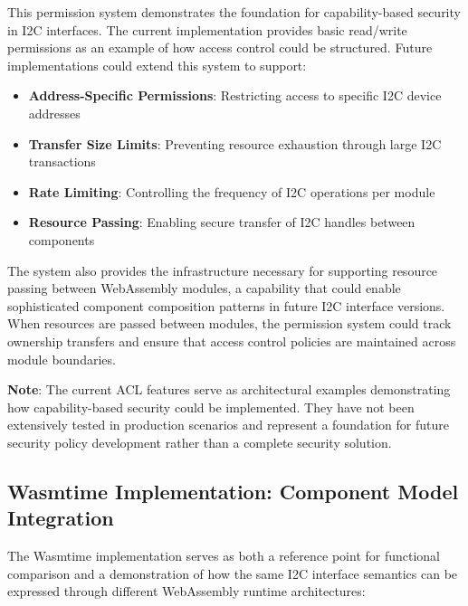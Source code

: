 This permission system demonstrates the foundation for capability-based security in I2C interfaces. The current implementation provides basic read/write permissions as an example of how access control could be structured. Future implementations could extend this system to support:

\begin{itemize}
    \item \textbf{Address-Specific Permissions}: Restricting access to specific I2C device addresses
    \item \textbf{Transfer Size Limits}: Preventing resource exhaustion through large I2C transactions
    \item \textbf{Rate Limiting}: Controlling the frequency of I2C operations per module
    \item \textbf{Resource Passing}: Enabling secure transfer of I2C handles between components
\end{itemize}

The system also provides the infrastructure necessary for supporting resource passing between WebAssembly modules, a capability that could enable sophisticated component composition patterns in future I2C interface versions. When resources are passed between modules, the permission system could track ownership transfers and ensure that access control policies are maintained across module boundaries.

\textbf{Note}: The current ACL features serve as architectural examples demonstrating how capability-based security could be implemented. They have not been extensively tested in production scenarios and represent a foundation for future security policy development rather than a complete security solution.

\subsection{Wasmtime Implementation: Component Model Integration}

The Wasmtime implementation serves as both a reference point for functional comparison and a demonstration of how the same I2C interface semantics can be expressed through different WebAssembly runtime architectures:

